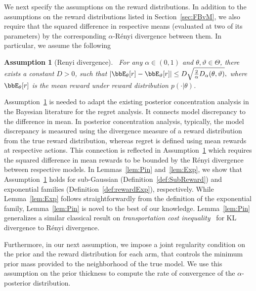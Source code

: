 \documentclass[11pt]{article}
\newtheorem{assumption}{Assumption}[section]
\begin{document}
      We next specify the assumptions on the reward distributions. 
      In addition to the assumptions on the reward distributions listed in Section~\ref{sec:FBvM},  we also require that the squared difference in respective means (evaluated at two of its parameters) by the corresponding $\alpha$-R\'enyi divergence between them. 
      In particular, we assume the following
      \begin{assumption}[Renyi divergence]~\label{ass:Renyi}
      For any $\alpha\in(0,1)$ and $\theta,\vartheta \in \Theta$, there exists a constant $D>0$, such that
     \(   |\bbE_{\theta}[r]- \bbE_{\vartheta}[r]| \leq D\sqrt{\frac{2}{\alpha} D_{\alpha}(\theta,\vartheta)},\) where $\bbE_{\theta}[r]$ is the mean reward under reward distribution $p(\cdot|\theta)$. 
\end{assumption}
    Assumption~\ref{ass:Renyi} is needed to adapt the existing posterior concentration analysis in the Bayesian literature for the regret analysis. It connects model discrepancy to the difference in mean. In posterior concentration analysis, typically, the model discrepancy is measured using the divergence measure of a reward distribution from the true reward distribution, whereas regret is defined using mean rewards at respective actions. This connection is reflected in Assumption~\ref{ass:Renyi} which requires the squared difference in mean rewards to be bounded by the R\'enyi divergence between respective models. In Lemmas~\ref{lem:Pin} and~\ref{lem:Exp}, we show that Assumption~\ref{ass:Renyi} holds for sub-Gaussian (Definition~\ref{def:SubReward}) and exponential families (Definition~\ref{def:rewardExp}), respectively. While Lemma~\ref{lem:Exp} follows straightforwardly from the definition of the exponential family, Lemma~\ref{lem:Pin} is novel to the best of our knowledge. Lemma~\ref{lem:Pin} generalizes a similar classical result on \textit{transportation cost inequality}~\cite[Lemma 4.18]{Boucheron2013} for KL divergence to R\'enyi divergence.
       
        
        
        Furthermore, in our next assumption, we impose a joint regularity condition on the prior and the reward distribution for each arm, that controls the minimum prior mass provided to the neighborhood of the true model. We use this assumption on the prior thickness to compute the rate of convergence of the $\alpha$-posterior distribution. 
        
\end{document}
